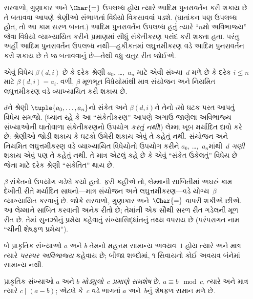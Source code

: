 \begingroup
\makeatletter{}\makeatother

\label{guunit:OLP-0292}



સરવાળો, ગુણાકાર અને $\Char{=}$
ઉપલબ્ધ હોય ત્યારે આદિમ પુનરાવર્તન
કરી શકાય છે તે બતાવવા આપણે શ્રેણીઓ
સંભાળતાં વિધેયો વિકસાવવાં પડશે.
(ઘાતાંકન પણ ઉપલબ્ધ હોત, તો આ કામ
સરળ બનત.) આદિમ પુનરાવર્તન
ઉપલબ્ધ હતું ત્યારે ``$n$મો
અવિભાજ્ય'' જેવા વિધેયો વ્યાખ્યાયિત
કરીને પ્રમાણમાં સીધું સંકેતીકરણ
પસંદ કરી શકતા હતા. પરંતુ અહીં
આદિમ પુનરાવર્તન ઉપલબ્ધ નથી—હકીકતમાં
લઘુત્તમીકરણ વડે આદિમ પુનરાવર્તન
કરી શકાય છે તે જ બતાવવાનું છે—તેથી
વધુ ચતુર રીત જોઈએ.

\begin{lem}
એવું વિધેય $\beta(d,i)$ છે કે
દરેક શ્રેણી $a_0$, \dots,~$a_n$
માટે એવી સંખ્યા~$d$ મળે છે કે
દરેક $i \le n$ માટે
$\beta(d,i) = a_i$. વળી, $\beta$
મૂળભૂત વિધેયોમાંથી માત્ર સંયોજન
અને નિયમિત લઘુત્તમીકરણ વડે
વ્યાખ્યાયિત કરી શકાય છે.
\end{lem}

$d$ને શ્રેણી $\tuple{a_0, \dots,
a_n}$નો સંકેત અને $\beta(d,i)$ને
તેનો $i$મો ઘટક પરત આપતું વિધેય
સમજો. (ધ્યાન રહે કે આ
``સંકેતીકરણ'' આપણે અગાઉ જાણેલા
અવિભાજ્ય સંખ્યાઓની ઘાતોવાળા સંકેતીકરણનો
ઉપયોગ \emph{કરતું નથી}!) લેમ્મા
ખૂબ મર્યાદિત દાવો કરે છે: શ્રેણીઓ
જોડી શકાય કે ઘટકો ઉમેરી શકાય
એવું તે કહેતું નથી. સંયોજન અને
નિયમિત લઘુત્તમીકરણ વડે વ્યાખ્યાયિત
વિધેયોનો ઉપયોગ કરીને $a_0$,
\dots,~$a_n$માંથી~$d$ \emph{ગણી}
શકાય એવું પણ તે કહેતું નથી.
તે માત્ર એટલું કહે છે કે એવું
``સંકેત ઉકેલતું'' વિધેય છે જેના માટે
દરેક શ્રેણી ``સંકેતિત'' થાય છે.

$\beta$ સંકેતનો ઉપયોગ ગડેલે કર્યો
હતો. ફરી કહીએ તો, લેમ્માની
સાબિતીમાં અઘરું કામ દેખીતી રીતે
મર્યાદિત સાધનો—માત્ર સંયોજન અને
લઘુત્તમીકરણ—વડે યોગ્ય~$\beta$
વ્યાખ્યાયિત કરવાનું છે. જોકે સરવાળો,
ગુણાકાર અને~$\Char{=}$ વાપરી
શકીએ છીએ. આ લેમ્માને સાબિત
કરવાની અનેક રીતો છે; તેમાંની એક
સૌથી સરળ રીત ગડેલની મૂળ રીત છે.
તેમાં સુનઝીનું પ્રમેય કહેવાતું
સંખ્યાસિદ્ધાંતનું તથ્ય વપરાય છે
(પરંપરાગત નામ ``ચીની શેષફળ પ્રમેય'').

\begin{defn}
બે પ્રાકૃતિક સંખ્યાઓ $a$ અને $b$
તેમનો મહત્તમ સામાન્ય અવયવ~$1$
હોય ત્યારે અને માત્ર ત્યારે
\emph{પરસ્પર અવિભાજ્ય} કહેવાય છે;
બીજા શબ્દોમાં, ૧ સિવાયનો
કોઈ અવયવ બંનેમાં સામાન્ય નથી.
\end{defn}

\begin{defn}
પ્રાકૃતિક સંખ્યાઓ $a$ અને $b$
\emph{મોડ્યુલો~$c$ પ્રમાણે સમશેષ}
છે, $a \equiv b \mod c$, ત્યારે
અને માત્ર ત્યારે $c \mid (a-b)$;
એટલે કે~$c$ વડે ભાગતાં
$a$ અને~$b$નું
શેષફળ સમાન મળે છે.
\end{defn}

